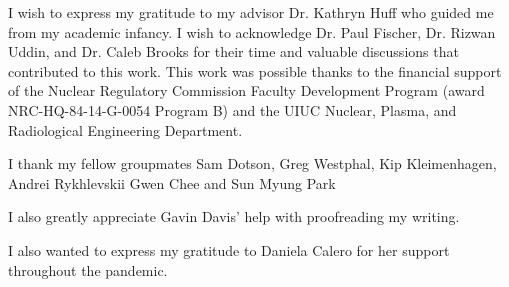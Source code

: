 
I wish to express my gratitude to my advisor Dr. Kathryn Huff who guided me from my academic infancy.
I wish to acknowledge Dr. Paul Fischer, Dr. Rizwan Uddin, and Dr. Caleb Brooks for their time and valuable discussions that contributed to this work.
This work was possible thanks to the financial support of the Nuclear Regulatory Commission Faculty Development Program (award NRC-HQ-84-14-G-0054 Program B) and the UIUC Nuclear, Plasma, and Radiological Engineering Department.

I thank my fellow groupmates Sam Dotson, Greg Westphal, Kip Kleimenhagen, Andrei Rykhlevskii Gwen Chee and Sun Myung Park

I also greatly appreciate Gavin Davis' help with proofreading my writing.

I also wanted to express my gratitude to Daniela Calero for her support throughout the pandemic.





